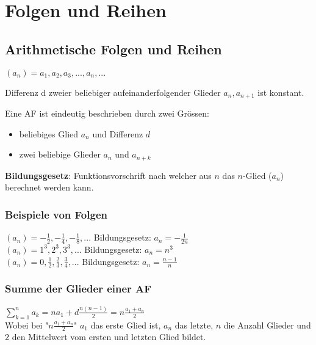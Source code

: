 \documentclass[../main.tex]{subfiles}
\begin{document}
\chapter{Folgen und Reihen}
\section{Arithmetische Folgen und Reihen}

$(a_n) = a_1,a_2,a_3,...,a_n,...$

\begin{flushleft}
Differenz d zweier beliebiger aufeinanderfolgender Glieder $a_n,a_{n+1}$ ist konstant.
\end{flushleft}

Eine AF ist eindeutig beschrieben durch zwei Grössen:
\begin{itemize}
    \item beliebiges Glied $a_n$ und Differenz $d$
    \item zwei beliebige Glieder $a_n$ und $a_{n+k}$
\end{itemize}

\begin{flushleft}
\textbf{Bildungsgesetz}: Funktionsvorschrift nach welcher aus $n$ das $n$-Glied ($a_n$) berechnet werden kann.
\end{flushleft}

\subsection{Beispiele von Folgen}
$(a_n) = -\frac{1}{2},-\frac{1}{4},-\frac{1}{8},...$ Bildungsgesetz: $a_n=-\frac{1}{2n}$ \\ [7pt]
$(a_n) = 1^3,2^3,3^3,...$ Bildungsgesetz: $a_n=n^3$ \\ [7pt]
$(a_n) = 0,\frac{1}{2},\frac{2}{3},\frac{3}{4},...$ Bildungsgesetz: $a_n=\frac{n-1}{n}$

\subsection{Summe der Glieder einer AF}
\begin{math}
    \sum\limits_{k=1}^n a_k = na_1 + d \frac{n(n-1)}{2} = n \frac{a_1 + a_n}{2}
\end{math} \\ [7pt]
Wobei bei "$n \frac{a_1 + a_n}{2}$" $a_1$ das erste Glied ist, $a_n$ das letzte, $n$ die Anzahl Glieder und $2$ den Mittelwert vom ersten und letzten Glied bildet.
\end{document}
